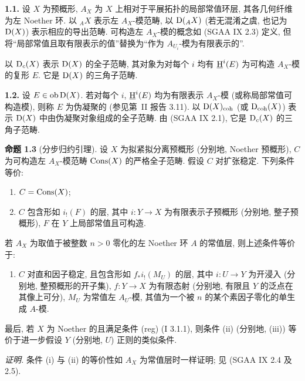 \textbf{1.1.} 设 $X$ 为预概形, $A_X$ 为 $X$ 上相对于平展拓扑的局部常值环层, 其各几何纤维为左 Noether 环. 以 ${}_A X$ 表示左 $A_X$-模范畴, 以 $\mathrm{D}({}_A X)$ (若无混淆之虞, 也记为 $\mathrm{D}(X)$) 表示相应的导出范畴. 可构造左 $A_X$-模的概念如 (SGAA IX 2.3) 定义, 但将“局部常值且取有限表示的值”替换为“作为 $A_{U_i}$-模为有限表示的”.

以 $\mathrm{D}_c(X)$ 表示 $\mathrm{D}(X)$ 的全子范畴, 其对象为对每个 $i$ 均有 $\underline{\mathrm H}^i(E)$ 为可构造 $A_X$-模的复形 $E$. 它是 $\mathrm{D}(X)$ 的三角子范畴.

\textbf{1.2.} 设 $E\in\operatorname{ob}\mathrm{D}(X)$. 若对每个 $i$, $\underline{\mathrm H}^i(E)$ 均为有限表示 $A_X$-模 (或称局部常值可构造模), 则称 $E$ 为伪凝聚的 (参见第~II 报告 3.11). 以 $\mathrm{D}(X)_{\mathrm{coh}}$ (或 $\mathrm{D}_{\mathrm{coh}}(X)$) 表示 $\mathrm{D}(X)$ 中由伪凝聚对象组成的全子范畴. 由 (SGAA IX 2.1), 它是 $\mathrm{D}_c(X)$ 的三角子范畴.

\textbf{命题 1.3} (分步归约引理). 设 $X$ 为拟紧拟分离预概形 (分别地, Noether 预概形), $C$ 为可构造左 $A_X$-模范畴 $\operatorname{Cons}(X)$ 的严格全子范畴. 假设 $C$ 对扩张稳定. 下列条件等价:
\begin{enumerate}[label=(\roman*)]
\item $C=\operatorname{Cons}(X)$;
\item $C$ 包含形如 $i_!(F)$ 的层, 其中 $i:Y\to X$ 为有限表示子预概形 (分别地, 整子预概形), $F$ 在 $Y$ 上局部常值且可构造.
\end{enumerate}
若 $A_X$ 为取值于被整数 $n>0$ 零化的左 Noether 环 $A$ 的常值层, 则上述条件等价于:
\begin{enumerate}[label=(\roman*),start=3]
\item $C$ 对直和因子稳定, 且包含形如 $f_*i_!(M_U)$ 的层, 其中 $i:U\to Y$ 为开浸入 (分别地, 整预概形的开子集), $f:Y\to X$ 为有限态射 (分别地, 有限且 $Y$ 的泛点在其像上可分), $M_U$ 为常值左 $A_U$-模, 其值为一个被 $n$ 的某个素因子零化的单生成 $A$-模.
\end{enumerate}
最后, 若 $X$ 为 Noether 的且满足条件 (reg) (I 3.1.1), 则条件 (ii) (分别地, (iii)) 等价于进一步假设 $Y$ (分别地, $U$) 正则的类似条件.

\emph{证明.} 条件 (i) 与 (ii) 的等价性如 $A_X$ 为常值层时一样证明; 见 (SGAA IX 2.4 及 2.5).

